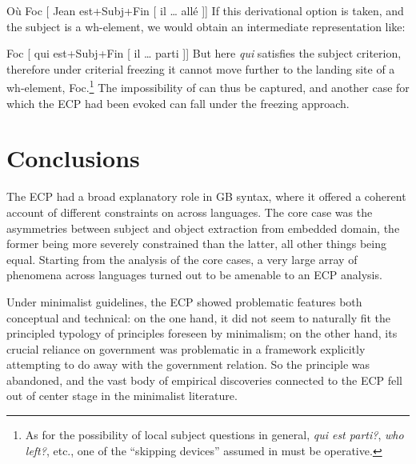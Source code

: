 \documentclass[output=paper]{langsci/langscibook}
\begin{document}
\begin{exe}
\ea%
    \label{ex:21.20}
    Où Foc  [ Jean est+Subj+Fin [ il \dots{} allé ]]
\z
%
If this derivational option is taken, and the subject is a wh-element, we would
obtain an intermediate representation like:

\ea%
    \label{ex:21.21}
    Foc  [ qui est+Subj+Fin [ il \dots{} parti ]]
\z
%
But here \emph{qui} satisfies the subject criterion, therefore under criterial
freezing it cannot move further to the landing site of a wh-element,
Foc.\footnote{As for the possibility of local subject questions in general,
    \emph{qui est parti?}, \emph{who left?}, etc., one of the “skipping
devices” assumed in \textcite{RizziShlonsky2007} must be operative.} The
impossibility of  can thus be captured, and another case for
which the \gls{ECP} had been evoked can fall under the freezing approach.

\section{Conclusions}

The \gls{ECP} had a broad explanatory role in \gls{GB} syntax, where it offered
a coherent account of different constraints on  across languages. The
core case was the asymmetries between subject and object extraction from
embedded domain, the former being more severely constrained than the latter,
all other things being equal. Starting from the analysis of the core cases, a
very large array of phenomena across languages turned out to be amenable to an
\gls{ECP} analysis.

Under minimalist guidelines, the \gls{ECP} showed problematic features both
conceptual and technical: on the one hand, it did not seem to naturally fit the
principled typology of principles foreseen by minimalism; on the other hand,
its crucial reliance on government was problematic in a framework explicitly
attempting to do away with the government relation. So the principle was
abandoned, and the vast body of empirical discoveries connected to the
\gls{ECP} fell out of center stage in the minimalist literature.


\end{exe}
\end{document}
